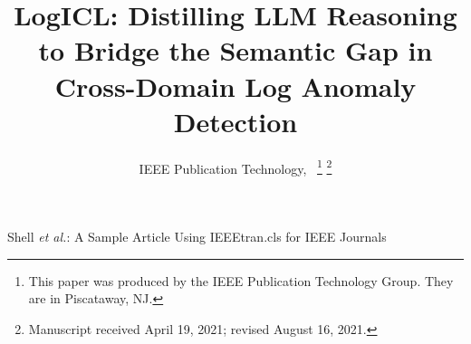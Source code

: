 \documentclass[lettersize,journal]{IEEEtran}
\begin{document}
\title{LogICL: Distilling LLM Reasoning to Bridge the Semantic Gap in Cross-Domain Log Anomaly Detection}

\author{IEEE Publication Technology,~
\thanks{This paper was produced by the IEEE Publication Technology Group. They are in Piscataway, NJ.}%
\thanks{Manuscript received April 19, 2021; revised August 16, 2021.}}

%
{Shell \MakeLowercase{\textit{et al.}}: A Sample Article Using IEEEtran.cls for IEEE Journals}


\maketitle
\end{document}
